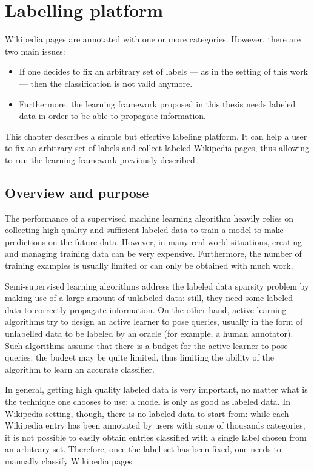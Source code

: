 \chapter{Labelling platform}\label{labelling_platform}
    Wikipedia pages are annotated with one or more categories. However, there are two main issues:
    \begin{itemize}
        \item If one decides to fix an arbitrary set of labels --- as in the setting of this work --- then the classification is not valid anymore.
        \item Furthermore, the learning framework proposed in this thesis needs labeled data in order to be able to propagate information.
    \end{itemize}
    
    This chapter describes a simple but effective labeling platform. It can help a user to fix an arbitrary set of labels and collect labeled Wikipedia pages, thus allowing to run the learning framework previously described.
    \section{Overview and purpose}
        The performance of a supervised machine learning algorithm heavily relies on collecting high quality and sufficient labeled data to train a model to make predictions on the future data. However, in many real-world situations, creating and managing training data can be very expensive. Furthermore, the number of training examples is usually limited or can only be obtained with much work.
        
        Semi-supervised learning algorithms address the labeled data sparsity problem by making use of a large amount of unlabeled data: still, they need some labeled data to correctly propagate information. On the other hand, active learning algorithms try to design an active learner to pose queries, usually in the form of unlabelled data to be labeled by an oracle (for example, a human annotator). Such algorithms assume that there is a budget for the active learner to pose queries: the budget may be quite limited, thus limiting the ability of the algorithm to learn an accurate classifier.
    
        In general, getting high quality labeled data is very important, no matter what is the technique one chooses to use: a model is only as good as labeled data. In Wikipedia setting, though, there is no labeled data to start from: while each Wikipedia entry has been annotated by users with some of thousands categories, it is not possible to easily obtain entries classified with a single label chosen from an arbitrary set. Therefore, once the label set has been fixed, one needs to manually classify Wikipedia pages.
        

